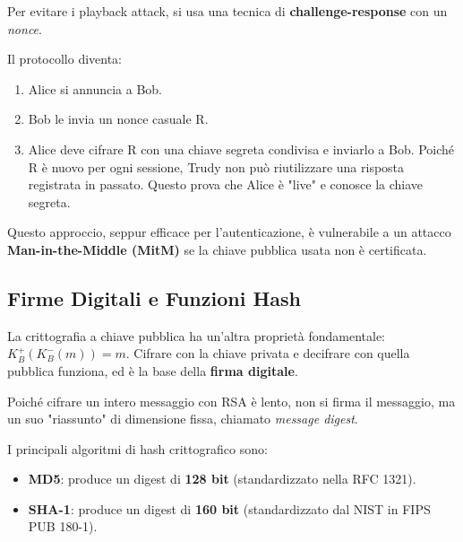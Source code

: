 Per evitare i playback attack, si usa una tecnica di \textbf{challenge-response} con un \textit{nonce}.


Il protocollo diventa:
\begin{enumerate}
    \item Alice si annuncia a Bob.
    \item Bob le invia un nonce casuale R.
    \item Alice deve cifrare R con una chiave segreta condivisa e inviarlo a Bob. Poiché R è nuovo per ogni sessione, Trudy non può riutilizzare una risposta registrata in passato. Questo prova che Alice è "live" e conosce la chiave segreta.
\end{enumerate}

Questo approccio, seppur efficace per l'autenticazione, è vulnerabile a un attacco \textbf{Man-in-the-Middle (MitM)} se la chiave pubblica usata non è certificata.

\subsection{Firme Digitali e Funzioni Hash}
La crittografia a chiave pubblica ha un'altra proprietà fondamentale: $K_B^{+}(K_B^{-}(m)) = m$. Cifrare con la chiave privata e decifrare con quella pubblica funziona, ed è la base della \textbf{firma digitale}.


Poiché cifrare un intero messaggio con RSA è lento, non si firma il messaggio, ma un suo "riassunto" di dimensione fissa, chiamato \textit{message digest}.


I principali algoritmi di hash crittografico sono:
\begin{itemize}
    \item \textbf{MD5}: produce un digest di \textbf{128 bit} (standardizzato nella RFC 1321).
    \item \textbf{SHA-1}: produce un digest di \textbf{160 bit} (standardizzato dal NIST in FIPS PUB 180-1).
\end{itemize}

